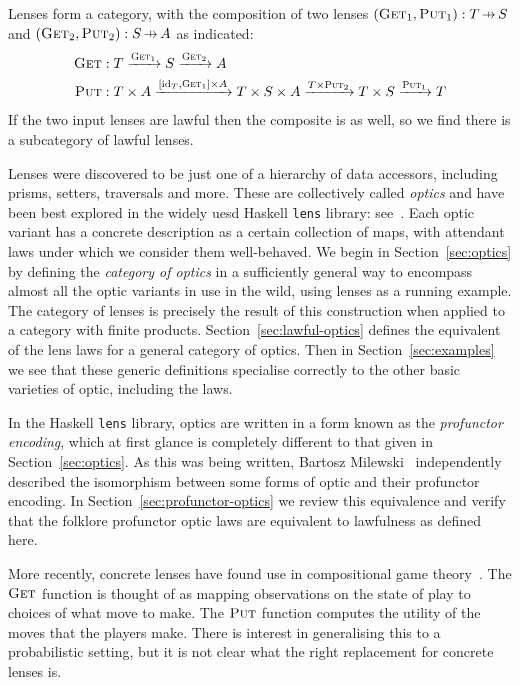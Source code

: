 \documentclass[11pt,letterpaper]{article}
\theoremstyle{plain}
\theoremstyle{definition}
\newcommand{\lenslib}{\texttt{lens}}
\newcommand{\id}{\mathrm{id}}
\newcommand{\fget}{\textsc{Get}}
\newcommand{\fput}{\textsc{Put}}
\newcommand{\hto}{\ensuremath{\,\mathaccent\shortmid\rightarrow\,}}
\begin{document}
Lenses form a category, with the composition of two lenses $(\fget_1, \fput_1) : T \hto S$ and $(\fget_2, \fput_2) : S \hto A$ as indicated:
\begin{align*}
\fget &: T \xrightarrow{\fget_1} S \xrightarrow{\fget_2} A \\
\fput &: T \times A \xrightarrow{[\id_T, \fget_1] \times A} T \times S \times A \xrightarrow{T \times \fput_2} T \times S \xrightarrow{\fput_1} T
\end{align*}
If the two input lenses are lawful then the composite is as well, so we find there is a subcategory of lawful lenses.

Lenses were discovered to be just one of a hierarchy of data accessors, including prisms, setters, traversals and more. These are collectively called \emph{optics} and have been best explored in the widely uesd Haskell \lenslib{} library: see~\cite{LensLibrary}. Each optic variant has a concrete description as a certain collection of maps, with attendant laws under which we consider them well-behaved. We begin in Section~\ref{sec:optics} by defining the \emph{category of optics} in a sufficiently general way to encompass almost all the optic variants in use in the wild, using lenses as a running example. The category of lenses is precisely the result of this construction when applied to a category with finite products. Section~\ref{sec:lawful-optics} defines the equivalent of the lens laws for a general category of optics. Then in Section~\ref{sec:examples} we see that these generic definitions specialise correctly to the other basic varieties of optic, including the laws. %

In the Haskell \lenslib{} library, optics are written in a form known as the \emph{profunctor encoding}, which at first glance is completely different to that given in Section~\ref{sec:optics}. As this was being written, Bartosz Milewski~\cite{ProfunctorOpticsPost} independently described the isomorphism between some forms of optic and their profunctor encoding. In Section~\ref{sec:profunctor-optics} we review this equivalence and verify that the folklore profunctor optic laws are equivalent to lawfulness as defined here.

More recently, concrete lenses have found use in compositional game theory~\cite{CompositionalGameTheory}. The $\fget$ function is thought of as mapping observations on the state of play to choices of what move to make. The $\fput$ function computes the utility of the moves that the players make. There is interest in generalising this to a probabilistic setting, but it is not clear what the right replacement for concrete lenses is.
\end{document}
